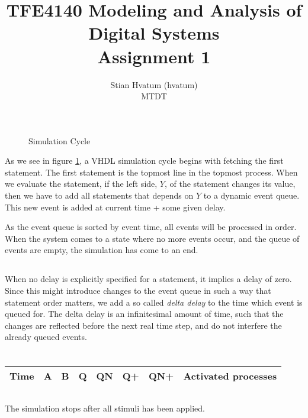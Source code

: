 \documentclass[english,a4paper]{report}
\title{TFE4140 Modeling and Analysis of Digital Systems\\
\Huge Assignment 1}
\author{Stian Hvatum (hvatum)\\MTDT}
\begin{document}
\maketitle
\tableofcontents
\newpage
\section{}
\subsection{}
\subsection{}
\begin{figure}

\caption{Simulation Cycle}
\label{dia:simcycle}
\end{figure}
As we see in figure \ref{dia:simcycle}, a VHDL simulation cycle begins with fetching the first statement.
The first statement is the topmost line in the topmost process.
When we evaluate the statement, if the left side, $Y$, of the statement changes its value, then we have to add
all statements that depends on $Y$ to a dynamic event queue. This new event is added at current time + some given delay.

As the event queue is sorted by event time, all events will be processed in order. When the system comes to a state where no more
events occur, and the queue of events are empty, the simulation has come to an end.

\subsection{}
When no delay is explicitly specified for a statement, it implies a delay of zero. Since this might introduce changes to the
event queue in such a way that statement order matters, we add a so called \textit{delta delay} to the time which event is queued for.
The delta delay is an infinitesimal amount of time, such that the changes are reflected before the next real time step,
and do not interfere the already queued events.

\section{}
\subsection{}
\begin{tabular}{|c|c|c|c|c|c|c|c|}
    \hline
    Time	&A	&B	&Q	&QN	&Q+	&QN+	&Activated processes\\
    \hline
    
    \hline
\end{tabular}
\subsection{}
The simulation stops after all stimuli has been applied.

\subsection{}


\end{document}

